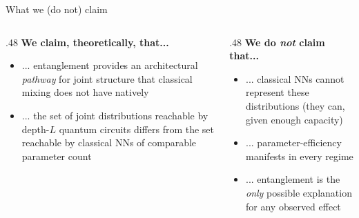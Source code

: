 \begin{frame}{What we (do not) claim}
    \begin{columns}[T]
    \begin{column}{.48\textwidth}
        \textbf{We claim, theoretically, that... }
        \begin{itemize}
            \item ... entanglement provides an architectural
            \emph{pathway} for joint structure that
            classical mixing does not have natively
            \item ... the set of joint distributions reachable
            by depth-$L$ quantum circuits differs from the
            set reachable by classical NNs of comparable
            parameter count
        \end{itemize}
    \end{column}
    \hfill
    \begin{column}{.48\textwidth}
        \textbf{We do \textit{not} claim that...}
        \begin{itemize}
            \item ... classical NNs cannot represent
            these distributions (they can, given enough
            capacity)
            \item ... parameter-efficiency manifests in
            every regime
            \item ... entanglement is the \emph{only}
            possible explanation for any observed effect
        \end{itemize}
    \end{column}
    \end{columns}
    \medskip

\end{frame}
